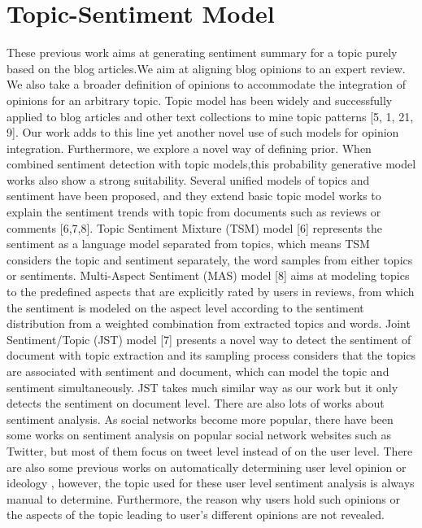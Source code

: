 \documentclass[runningheads,a4paper]{llncs}
\begin{document}
\section{Topic-Sentiment Model}
These previous work aims at generating sentiment summary for a topic purely based on the blog articles.We aim at aligning blog opinions to an expert review. We also take a broader definition of opinions to accommodate the integration of opinions for an arbitrary topic. Topic model has been widely and successfully applied to
blog articles and other text collections to mine topic patterns [5, 1, 21, 9]. Our work adds to this line yet another novel use of such models for opinion integration. Furthermore, we explore a novel way of defining prior.
When combined sentiment detection with topic models,this probability generative model works also show a strong suitability. Several
unified models of topics and sentiment have been proposed, and they extend basic topic model works to explain the sentiment trends with topic from documents such as reviews or comments \cite{mei2007topic,lin2009joint,jo2011aspect,zhao2012user}[6,7,8]. Topic Sentiment Mixture (TSM) model [6] represents the sentiment as a language model separated from topics, which means TSM considers the topic and sentiment separately, the word samples from either topics or sentiments. Multi-Aspect Sentiment (MAS) model [8] aims at modeling topics to the predefined aspects that are explicitly rated by users in reviews, from which the sentiment is modeled on the aspect level according to the sentiment distribution from a weighted combination from extracted topics and words. Joint Sentiment/Topic (JST) model [7] presents a novel way to detect the sentiment of document with topic extraction and its sampling process considers that the topics are associated with sentiment and document, which can model the topic and sentiment simultaneously. JST takes much similar way as our work but it only detects the sentiment on document level. There are also lots of works about sentiment analysis. As social networks become more popular, there have been some works on sentiment analysis on popular social network websites such as Twitter, but most of them\cite{li2010micro,o2010tweets,barbosa2010robust,davidov2010enhanced,jiang2011target} focus on tweet level instead of on the user level. There are also some previous works on automatically determining user level opinion or ideology \cite{agrawal2003mining,mostafa2013more,malouf2008taking,yu2008classifying}, however, the topic used for these user level sentiment analysis is always manual to determine. Furthermore, the reason why users hold such opinions or the aspects of the topic leading to user’s different opinions are not revealed.
\end{document}
